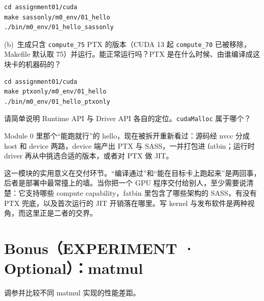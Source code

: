 \documentclass[11pt,a4paper,fontset=none]{ctexart}
\begin{document}
\begin{lstlisting}
cd assignment01/cuda
make sassonly/m0_env/01_hello
./bin/m0_env/01_hello_sassonly
\end{lstlisting}


(b)~生成只含 \texttt{compute\_75} PTX 的版本（CUDA 13 起 \texttt{compute\_70} 已被移除，Makefile 默认取 75）并运行。能正常运行吗？PTX 是在什么时候、由谁编译成这块卡的机器码的？

\begin{lstlisting}
cd assignment01/cuda
make ptxonly/m0_env/01_hello
./bin/m0_env/01_hello_ptxonly
\end{lstlisting}


请简单说明 Runtime API 与 Driver API 各自的定位。\texttt{cudaMalloc} 属于哪个？


\begin{lookback}
Module 0 里那个“能跑就行”的 hello，现在被拆开重新看过：源码经 nvcc 分成 host 和 device 两路，device 端产出 PTX 与 SASS，一并打包进 fatbin；运行时 driver 再从中挑选合适的版本，或者对 PTX 做 JIT。

这一模块的实用意义在交付环节。“编译通过”和“能在目标卡上跑起来”是两回事，后者是部署中最常撞上的墙。当你把一个 GPU 程序交付给别人，至少需要说清楚：它支持哪些 compute capability，fatbin 里包含了哪些架构的 SASS，有没有 PTX 兜底，以及首次运行的 JIT 开销落在哪里。写 kernel 与发布软件是两种视角，而这里正是二者的交界。
\end{lookback}

\clearpage
\section*{Bonus（EXPERIMENT · Optional）：matmul}

调参并比较不同 matmul 实现的性能差距。
\end{document}
